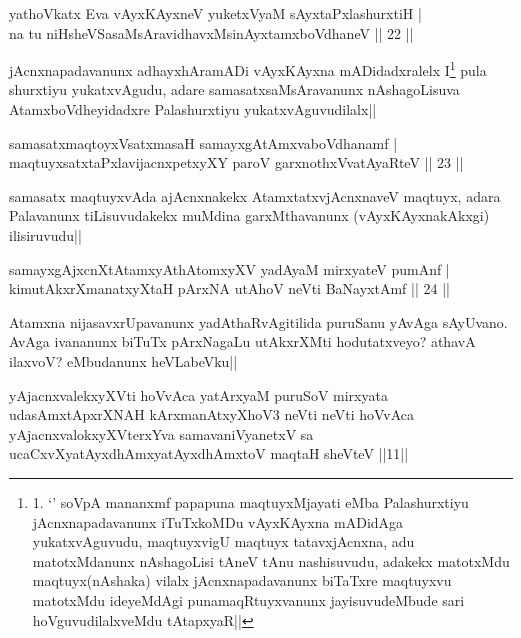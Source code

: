 \begin{shl}
yathoVkatx Eva vAyxKAyxneV yuketxVyaM sAyxtaPxlashurxtiH |\\
na tu niHsheVSasaMsAravidhavxMsinAyxtamxboVdhaneV \hfill || 22 ||
\end{shl}

\begin{artha}
jAcnxnapadavanunx adhayxhAramADi vAyxKAyxna mADidadxralelx I\footnote{1. `\stext' soV\s pA mananxmf papapuna maqtuyxMjayati eMba Palashurxtiyu jAcnxnapadavanunx iTuTxkoMDu vAyxKAyxna mADidAga yukatxvAguvudu, maqtuyxvigU maqtuyx tatavxjAcnxna, adu matotxMdanunx nAshagoLisi tAneV tAnu nashisuvudu, adakekx matotxMdu maqtuyx(nAshaka) vilalx jAcnxnapadavanunx biTaTxre maqtuyxvu matotxMdu ideyeMdAgi punamaqRtuyxvanunx jayisuvudeMbude sari hoVguvudilalxveMdu tAtapxyaR||} pula shurxtiyu yukatxvAgudu, adare samasatxsaMsAravanunx nAshagoLisuva AtamxboVdheyidadxre Palashurxtiyu yukatxvAguvudilalx||
\end{artha}


\begin{shl}
samasatxmaqtoyxVsatxmasaH samayxgAtAmxvaboVdhanamf |\\
maqtuyxsatxtaPxlavijacnxpetxyXY paroV garxnothxV\s vatAyaRteV \hfill || 23 ||
\end{shl}

\begin{artha}
samasatx maqtuyxvAda ajAcnxnakekx AtamxtatxvjAcnxnaveV maqtuyx, adara Palavanunx tiLisuvudakekx muMdina garxMthavanunx (vAyxKAyxnakAkxgi) ilisiruvudu||
\end{artha}


\begin{shl}
samayxgAjxcnXtAtamxyAthAtomxyXV yadA\s yaM mirxyateV pumAnf |\\
kimutAkxrXmanatxyXtaH pArxNA utAhoV neVti BaNayxtAmf \hfill || 24 ||
\end{shl}

\begin{artha}
Atamxna nijasavxrUpavanunx yadAthaRvAgitilida puruSanu yAvAga sAyUvano. AvAga ivananunx 
biTuTx pArxNagaLu utAkxrXMti hodutatxveyo? athavA ilaxvoV? eMbudanunx heVLabeVku||
\end{artha}


\begin{shl}
yAjacnxvalekxyXVti hoVvAca yatArxyaM puruSoV mirxyata udasAmxtApxrXNAH kArxmanAtxyXhoV3 neVti neVti hoVvAca yAjacnxvalokxyXV\s terxYva samavaniVyanetxV sa ucaCxvXyatAyxdhAmxyatAyxdhAmxtoV maqtaH sheVteV ||11||
\end{shl}

